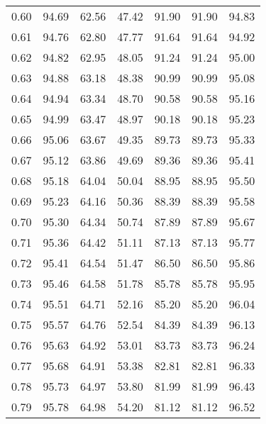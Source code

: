 \begin{tabular}{|c|c|c|c|c|c|c|}
      0.60 &     94.69 &     62.56 &      47.42 &   91.90 &      91.90 &         94.83 \\
      0.61 &     94.76 &     62.80 &      47.77 &   91.64 &      91.64 &         94.92 \\
      0.62 &     94.82 &     62.95 &      48.05 &   91.24 &      91.24 &         95.00 \\
      0.63 &     94.88 &     63.18 &      48.38 &   90.99 &      90.99 &         95.08 \\
      0.64 &     94.94 &     63.34 &      48.70 &   90.58 &      90.58 &         95.16 \\
      0.65 &     94.99 &     63.47 &      48.97 &   90.18 &      90.18 &         95.23 \\
      0.66 &     95.06 &     63.67 &      49.35 &   89.73 &      89.73 &         95.33 \\
      0.67 &     95.12 &     63.86 &      49.69 &   89.36 &      89.36 &         95.41 \\
      0.68 &     95.18 &     64.04 &      50.04 &   88.95 &      88.95 &         95.50 \\
      0.69 &     95.23 &     64.16 &      50.36 &   88.39 &      88.39 &         95.58 \\
      0.70 &     95.30 &     64.34 &      50.74 &   87.89 &      87.89 &         95.67 \\
      0.71 &     95.36 &     64.42 &      51.11 &   87.13 &      87.13 &         95.77 \\
      0.72 &     95.41 &     64.54 &      51.47 &   86.50 &      86.50 &         95.86 \\
      0.73 &     95.46 &     64.58 &      51.78 &   85.78 &      85.78 &         95.95 \\
      0.74 &     95.51 &     64.71 &      52.16 &   85.20 &      85.20 &         96.04 \\
      0.75 &     95.57 &     64.76 &      52.54 &   84.39 &      84.39 &         96.13 \\
      0.76 &     95.63 &     64.92 &      53.01 &   83.73 &      83.73 &         96.24 \\
      0.77 &     95.68 &     64.91 &      53.38 &   82.81 &      82.81 &         96.33 \\
      0.78 &     95.73 &     64.97 &      53.80 &   81.99 &      81.99 &         96.43 \\
      0.79 &     95.78 &     64.98 &      54.20 &   81.12 &      81.12 &         96.52 \\

\end{tabular}
